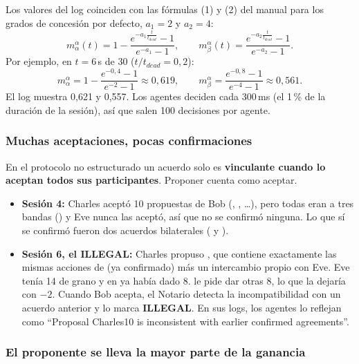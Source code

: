 Los valores del log coinciden con las fórmulas (1) y (2) del manual para los grados de concesión por
defecto, $a_1 = 2$ y $a_2 = 4$:
\begin{equation}
  m^{\alpha}_{\alpha}(t) = 1 - \frac{e^{-a_1 \frac{t}{t_{dead}}} - 1}{e^{-a_1} - 1},
  \qquad
  m^{\alpha}_{\beta}(t) = \frac{e^{-a_2 \frac{t}{t_{dead}}} - 1}{e^{-a_2} - 1}.
\end{equation}
Por ejemplo, en $t = 6$\,s de 30 ($t/t_{dead} = 0{,}2$):
\begin{equation}
  m^{\alpha}_{\alpha} = 1 - \frac{e^{-0{,}4} - 1}{e^{-2} - 1} \approx 0{,}619,
  \qquad
  m^{\alpha}_{\beta} = \frac{e^{-0{,}8} - 1}{e^{-4} - 1} \approx 0{,}561.
\end{equation}
El log muestra 0,621 y 0,557. Los agentes deciden cada 300\,ms (el 1\,\% de la duración de la
sesión), así que salen 100 decisiones por agente.

\subsubsection{Muchas aceptaciones, pocas confirmaciones}
\label{sec:ej1-aceptaciones}

En el protocolo no estructurado un acuerdo solo es \textbf{vinculante cuando lo aceptan todos sus
participantes}. Proponer cuenta como aceptar.

\begin{itemize}
  \item \textbf{Sesión 4:} Charles aceptó 10 propuestas de Bob (, , \ldots),
        pero todas eran a tres bandas () y Eve nunca las aceptó, así que no
        se confirmó ninguna. Lo que sí se confirmó fueron dos acuerdos bilaterales ( y
        ).
  \item \textbf{Sesión 6, el ILLEGAL:} Charles propuso , que contiene exactamente las
        mismas acciones de  (ya confirmado) más un intercambio propio con Eve. Eve tenía 14
        de grano y en  ya había dado 8.  le pide dar otras 8, lo que la
        dejaría con $-2$. Cuando Bob acepta, el Notario detecta la incompatibilidad con un acuerdo
        anterior y lo marca \textbf{ILLEGAL}. En sus logs, los agentes lo reflejan como
        \foreignquote{english}{Proposal Charles10 is inconsistent with earlier confirmed agreements}.
\end{itemize}

\subsubsection{El proponente se lleva la mayor parte de la ganancia}
\label{sec:ej1-proponente}

